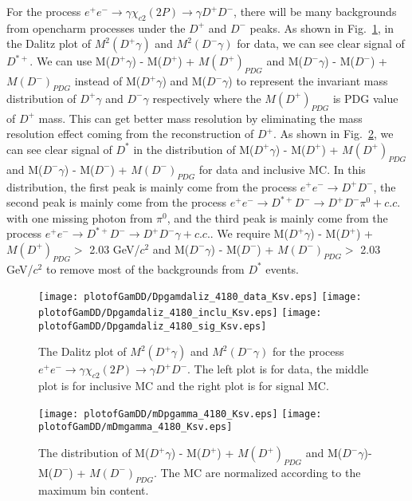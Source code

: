 \documentclass[aps,preprint,tightenlines,superscriptaddress,showpacs,byrevtex,amsmath,amssymb,nofloatfix]{revtex4}
\begin{document}
For the process $e^{+}e^{-}\rightarrow \gamma \chi_{c2} (2P)\rightarrow \gamma D^{+}D^{-}$, there will be many backgrounds from opencharm processes under the  $D^{+}$ and $D^{-}$ peaks. As shown in Fig.~\ref{DpgamvsDmgam}, in the Dalitz plot of $M^{2}(D^{+}\gamma)$ and  $M^{2}(D^{-}\gamma)$  for data, we can see clear signal of $D^{*+}$. We can use M($D^{+}\gamma$) - M($D^{+}$) + $M(D^{+})_{PDG}$ and M($D^{-}\gamma$) - M($D^{-}$) + $M(D^{-})_{PDG}$ instead of M($D^{+}\gamma$) and M($D^{-}\gamma$) to represent the invariant mass distribution of $D^{+}\gamma$ and $D^{-}\gamma$ respectively where the $M(D^{+})_{PDG}$ is PDG value of $D^{+}$ mass. This can get better mass resolution by eliminating the mass resolution effect coming from the reconstruction of $D^{+}$. As shown in Fig.~\ref{mDpGam}, we can see clear signal of $D^{*}$ in the distribution of M($D^{+}\gamma$) - M($D^{+}$) + $M(D^{+})_{PDG}$ and M($D^{-}\gamma$) - M($D^{-}$) + $M(D^{-})_{PDG}$ for data and inclusive MC. In this distribution, the first peak is mainly come from the process $e^{+}e^{-} \rightarrow D^{+}D^{-}$, the second peak is mainly come from the process $e^{+}e^{-} \rightarrow D^{*+}D^{-} \rightarrow D^{+}D^{-}\pi^{0}+c.c.$ with  one missing photon from $\pi^{0}$, and the third peak is mainly come from the process $e^{+}e^{-} \rightarrow D^{*+}D^{-} \rightarrow D^{+}D^{-}\gamma+c.c.$.  We require M($D^{+}\gamma$) - M($D^{+}$) + $M(D^{+})_{PDG} >$ 2.03 GeV/$c^{2}$  and M($D^{-}\gamma$) - M($D^{-}$) + $M(D^{-})_{PDG} >$ 2.03 GeV/$c^{2}$ to remove most of the backgrounds from $D^{*}$ events.


\begin{figure}[!htbp]
  \captionsetup{justification=raggedright}
    \texttt{[image: plotofGamDD/Dpgamdaliz\_4180\_data\_Ksv.eps]}
    \texttt{[image: plotofGamDD/Dpgamdaliz\_4180\_inclu\_Ksv.eps]}
    \texttt{[image: plotofGamDD/Dpgamdaliz\_4180\_sig\_Ksv.eps]}

  \caption{\small The Dalitz plot of $M^{2}(D^{+}\gamma)$ and $M^{2}(D^{-}\gamma)$ for the process $e^{+}e^{-}\rightarrow \gamma \chi_{c2} (2P)\rightarrow \gamma D^{+}D^{-}$. The left plot is for data, the middle plot is for inclusive MC and the right plot is for signal MC.}
  \label{DpgamvsDmgam}
\end{figure}



\begin{figure}[!htbp]
  \captionsetup{justification=raggedright}
    \texttt{[image: plotofGamDD/mDpgamma\_4180\_Ksv.eps]}
    \texttt{[image: plotofGamDD/mDmgamma\_4180\_Ksv.eps]}

  \caption{\small The distribution of M($D^{+}\gamma$) - M($D^{+}$) + $M(D^{+})_{PDG}$ and M($D^{-}\gamma$)- M($D^{-}$) + $M(D^{-})_{PDG}$. The MC are normalized according to the maximum bin content.}
  \label{mDpGam}
\end{figure}
\end{document}
